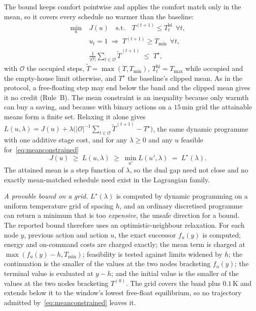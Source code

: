 \documentclass[3p,twocolumn,number]{elsarticle}
\newcommand{\Tmin}{T_{\min}}
\newcommand{\Tmax}{T_{\max}}
\begin{document}
The bound keeps comfort pointwise and applies the comfort match only in the mean, so it covers every schedule no warmer than the baseline:
\begin{equation}
\begin{split}
  \min_{u}\;&J(u)\quad\text{s.t.}\quad
    T^{(t+1)}\le T^{\mathrm{hi}}_t\ \ \forall t,\\
  &u_t=1\;\Rightarrow\;T^{(t+1)}\ge\Tmin\ \ \forall t,\\
  &\tfrac{1}{|\mathcal{O}|}\textstyle\sum_{t\in\mathcal{O}}\tilde T^{(t+1)}
    \;\le\;T^{\star},
\end{split}
\label{eq:meanconstrained}
\end{equation}
with $\mathcal{O}$ the occupied steps, $\tilde T=\max(T,\Tmin)$, $T^{\mathrm{hi}}_t=\Tmax$ while occupied and the empty-house limit otherwise, and $T^{\star}$ the baseline's clipped mean. As in the protocol, a free-floating step may end below the band and the clipped mean gives it no credit (Rule~B). The mean constraint is an inequality because only warmth can buy a saving, and because with binary actions on a $15\,$min grid the attainable means form a finite set. Relaxing it alone gives $L(u,\lambda)=J(u)+\lambda\bigl(|\mathcal{O}|^{-1}\sum_{t\in\mathcal{O}}\tilde T^{(t+1)}-T^{\star}\bigr)$, the same dynamic programme with one additive stage cost, and for any $\lambda\ge0$ and any $u$ feasible for~\eqref{eq:meanconstrained}
\begin{equation}
  J(u)\;\ge\;L(u,\lambda)\;\ge\;\min_{u'}L(u',\lambda)\;=\;L^{\star}(\lambda).
  \label{eq:dual_bound}
\end{equation}
The attained mean is a step function of $\lambda$, so the dual gap need not close and no exactly mean-matched schedule need exist in the Lagrangian family.

\emph{A provable bound on a grid.} $L^{\star}(\lambda)$ is computed by dynamic programming on a uniform temperature grid of spacing $h$, and an ordinary discretised programme can return a minimum that is too \emph{expensive}, the unsafe direction for a bound. The reported bound therefore uses an optimistic-neighbour relaxation. For each node $y$, previous action and action $u$, the exact successor $f_u(y)$ is computed; energy and on-command costs are charged exactly; the mean term is charged at $\max(f_u(y)-h,\Tmin)$; feasibility is tested against limits widened by $h$; the continuation is the smaller of the values at the two nodes bracketing $f_u(y)$; the terminal value is evaluated at $y-h$; and the initial value is the smaller of the values at the two nodes bracketing $T^{(0)}$. The grid covers the band plus $0.1\,$K and extends below it to the window's lowest free-float equilibrium, so no trajectory admitted by~\eqref{eq:meanconstrained} leaves it.
\end{document}
